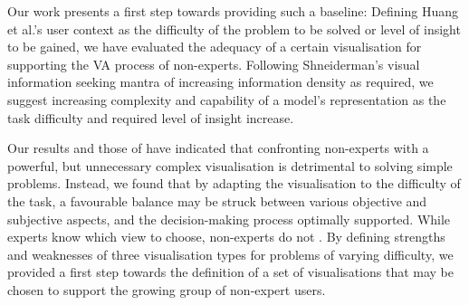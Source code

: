 \documentclass[final,5p,times,twocolumn,authoryear]{elsarticle}
\begin{document}
Our work presents a first step towards providing such a baseline: Defining Huang et al.'s user context as the difficulty of the problem to be solved or level of insight to be gained, we have evaluated the adequacy of a certain visualisation for supporting the VA process of non-experts. Following Shneiderman's visual information seeking mantra \citep{shneiderman1996} of increasing information density as required, we suggest increasing complexity and capability of a model's representation as the task difficulty and required level of insight increase.

Our results and those of \cite{kwon2011visual} have indicated that confronting non-experts with a powerful, but unnecessary complex visualisation is detrimental to solving simple problems. Instead, we found that by adapting the visualisation to the difficulty of the task, a favourable balance may be struck between various objective and subjective aspects, and the decision-making process optimally supported. While experts know which view to choose, non-experts do not \citep{kwon2011visual}. By defining strengths and weaknesses of three visualisation types for problems of varying difficulty, we provided a first step towards the definition of a set of visualisations that may be chosen to support the growing group of non-expert users.






\end{document}
